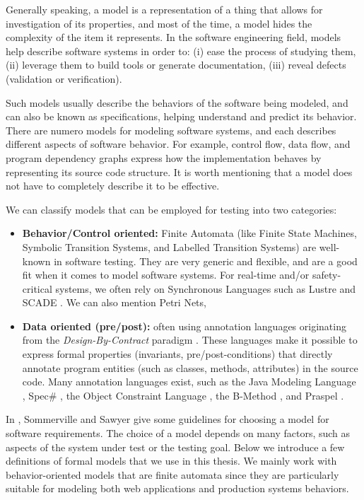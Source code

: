 Generally speaking, a model is a representation of a thing that
allows for investigation of its properties, and most of the time,
a model hides the complexity of the item it represents. In the
software engineering field, models help describe software systems
in order to: (i) ease the process of studying them, (ii) leverage
them to build tools or generate documentation, (iii) reveal
defects (validation or verification).

Such models usually describe the behaviors of the software being
modeled, and can also be known as specifications, helping
understand and predict its behavior. There are numero models for
modeling software systems, and each describes different aspects
of software behavior. For example, control flow, data flow, and
program dependency graphs express how the implementation behaves
by representing its source code structure. It is worth mentioning
that a model does not have to completely describe it to be
effective.

We can classify models that can be employed for testing into two
categories:

\begin{itemize}
\item \textbf{Behavior/Control oriented:} Finite Automata (like
Finite State Machines, Symbolic Transition Systems, and Labelled
Transition Systems) are well-known in software testing. They are
very generic and flexible, and are a good fit when it comes to
model software systems. For real-time and/or safety-critical
systems, we often rely on Synchronous Languages such as Lustre
\cite{lustre:ieee} and SCADE
\cite{LeSergent:2011:SCF:2188575.2188578}. We can also mention
Petri Nets,

\item \textbf{Data oriented (pre/post):} often using annotation
languages originating from the \textit{Design-By-Contract}
paradigm \cite{Meyer:1992:ADC:618974.619797}. These languages
make it possible to express formal properties (invariants,
pre/post-conditions) that directly annotate program entities
(such as classes, methods, attributes) in the source code. Many
annotation languages exist, such as the Java Modeling Language
\cite{jml}, Spec\# \cite{117852}, the Object Constraint Language
\cite{Warmer:1998:OCL:291202}, the B-Method
\cite{Lano:1996:BLM:525749}, and Praspel
\cite{Enderlin:2011:PSL:2075545.2075551}.
\end{itemize}

In \cite{Sommerville:1997:REG:549198}, Sommerville and Sawyer
give some guidelines for choosing a model for software
requirements. The choice of a model depends on many factors, such
as aspects of the system under test or the testing goal.  Below
we introduce a few definitions of formal models that we use in
this thesis. We mainly work with behavior-oriented models that
are finite automata since they are particularly suitable for
modeling both web applications and production systems behaviors.

